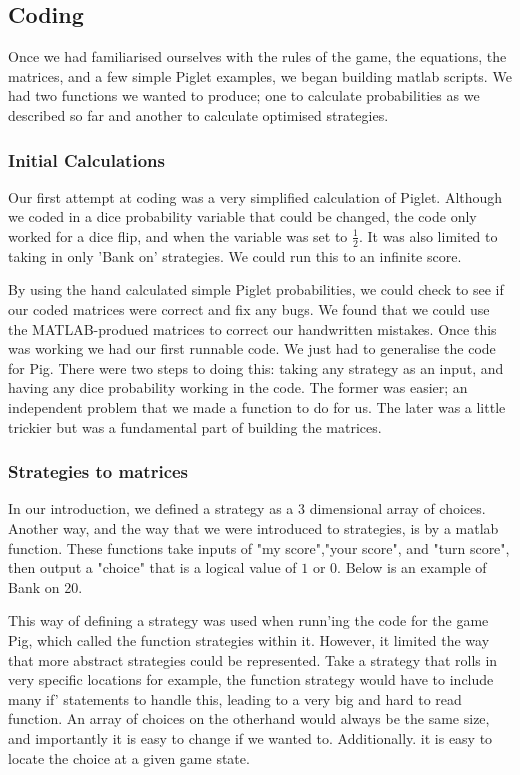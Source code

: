 \documentclass[a4paper,titlepage]{article}
\begin{document}
\subsection{Coding}
Once we had familiarised ourselves with the rules of the game, the equations, the matrices, and a few simple Piglet examples, we began building matlab scripts. We had two functions we wanted to produce; one to calculate probabilities as we described so far and another to calculate optimised strategies.

\subsubsection{Initial Calculations}
Our first attempt at coding was a very simplified calculation of Piglet. Although we coded in a dice probability variable that could be changed, the code only worked for a dice flip, and when the variable was set to $\frac{1}{2}$. It was also limited to taking in only 'Bank on' strategies. We could run this to an infinite score.

By using the hand calculated simple Piglet probabilities, we could check to see if our coded matrices were correct and fix any bugs. We found that we could use the MATLAB-produed matrices to correct our handwritten mistakes. Once this was working we had our first runnable code. We just had to generalise the code for Pig. There were two steps to doing this: taking any strategy as an input, and having any dice probability working in the code. The former was easier; an independent problem that we made a function to do for us. The later was a little trickier but was a fundamental part of building the matrices.

\subsubsection{Strategies to matrices}
In our introduction, we defined a strategy as a 3 dimensional array of choices. Another way, and the way that we were introduced to strategies, is by a matlab function. These functions take inputs of "my score","your score", and "turn score", then output a "choice" that is a logical value of $1$ or $0$. Below is an example of Bank on 20.


This way of defining a strategy was used when runn'ing the code for the game Pig, which called the function strategies within it. However, it limited the way that more abstract strategies could be represented. Take a strategy that rolls in very specific locations for example, the function strategy would have to include many if' statements to handle this, leading to a very big and hard to read function. An array of choices on the otherhand would always be the same size, and importantly it is easy to change if we wanted to. Additionally. it is easy to locate the choice at a given game state.
\end{document}
